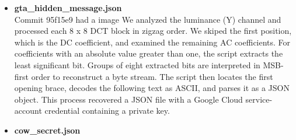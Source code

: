 \documentclass[11pt,a4paper,final,oneside]{article}
\begin{document}
\begin{itemize}
  \item \textbf{gta\_hidden\_message.json}
  \\Commit 95f15e9 had a image  
  We analyzed the luminance (Y) channel
  and processed each 8 x 8 DCT block in zigzag order. We skiped the first
  position, which is the DC coefficient, and examined the remaining AC
  coefficients. For coefficients with an absolute value greater than one, the
  script extracts the least significant bit. Groups of eight extracted bits
  are interpreted in MSB-first order to reconstruct a byte stream. The script
  then locates the first opening brace, decodes the following text as ASCII,
  and parses it as a JSON object. This process recovered a JSON file with a Google Cloud
  service-account credential containing a private key.

  \item \textbf{cow\_secret.json}


\end{itemize}
\end{document}

